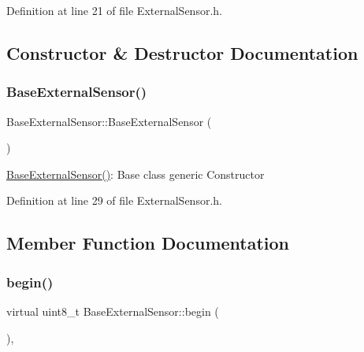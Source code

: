 Definition at line 21 of file External\+Sensor.\+h.



\subsection{Constructor \& Destructor Documentation}
\mbox{\label{class_base_external_sensor_a978d96a6563b646efb358c2790a9fc6f}} 
\subsubsection{\texorpdfstring{Base\+External\+Sensor()}{BaseExternalSensor()}}
{\footnotesize\ttfamily Base\+External\+Sensor\+::\+Base\+External\+Sensor (\begin{DoxyParamCaption}{ }\end{DoxyParamCaption})\hspace{0.3cm}{\ttfamily [inline]}}

\hyperlink{class_base_external_sensor_a978d96a6563b646efb358c2790a9fc6f}{Base\+External\+Sensor()}\+: Base class generic Constructor 

Definition at line 29 of file External\+Sensor.\+h.



\subsection{Member Function Documentation}
\mbox{\label{class_base_external_sensor_a87d132803d4f4fdd4e66332809f0c9a0}} 
\subsubsection{\texorpdfstring{begin()}{begin()}}
{\footnotesize\ttfamily virtual uint8\+\_\+t Base\+External\+Sensor\+::begin (\begin{DoxyParamCaption}{ }\end{DoxyParamCaption})\hspace{0.3cm}{\ttfamily [inline]}, {\ttfamily [virtual]}}

